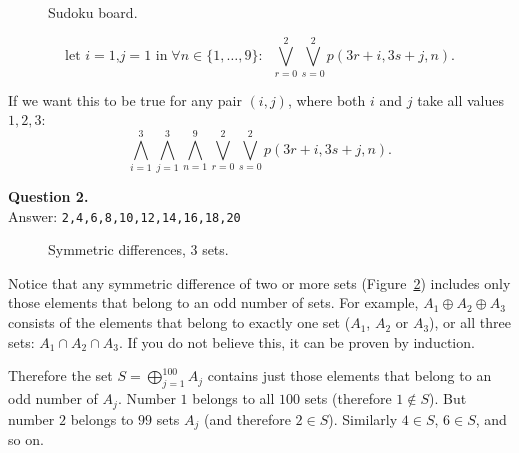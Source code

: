 \documentclass[jou]{apa6}
\begin{document}
\begin{figure}[!htb]
\caption{\label{fig:sudoku2} Sudoku board.}
\end{figure}

{\small
$$\mbox{let $i=1$,$j=1$ in}\;\forall n\in \{1,\ldots,9 \}:\;\;
\bigvee\limits_{r = 0}^{2} \bigvee\limits_{s = 0}^{2} p(3r+i, 3s+j, n).$$
}

If we want this to be true for any pair $(i,j)$, where both $i$ and $j$ take
all values $1,2,3$:
$$\bigwedge\limits_{i = 1}^{3} \bigwedge\limits_{j = 1}^{3} \bigwedge\limits_{n = 1}^{9}
\bigvee\limits_{r = 0}^{2} \bigvee\limits_{s = 0}^{2} p(3r+i, 3s+j, n).$$

\vspace{6pt}
{\bf Question 2.}\\ Answer: {\tt 2,4,6,8,10,12,14,16,18,20}\\

\begin{figure}[!htb]
\caption{\label{fig:symmetric-differences} Symmetric differences, 3 sets.}
\end{figure}

Notice that any symmetric difference of two or more sets (Figure~\ref{fig:symmetric-differences})
includes only those elements that belong to an odd number of sets. 
For example, $A_1 \oplus A_2 \oplus A_3$ consists of the elements
that belong to exactly one set ($A_1$, $A_2$ or $A_3$), or 
all three sets: $A_1 \cap A_2 \cap A_3$. 
If you do not believe this, it can be proven by induction. 

Therefore the set $S = \bigoplus\limits_{j=1}^{100} A_j$ contains just those
elements that belong to an odd number of $A_j$. Number $1$ belongs to all $100$ sets
(therefore $1 \not\in S$). But number $2$ belongs to $99$ sets $A_j$ 
(and therefore $2 \in S$). Similarly $4 \in S$, $6 \in S$, and so on. 
\end{document}
